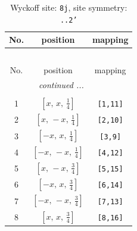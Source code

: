 \documentclass[fleqn,8pt]{jsarticle}
\begin{document}
\begin{longtable}{ccc}
\caption{Wyckoff site: {\tt 8j}, site symmetry: {\tt ..2'}}
 \\
 \hline \hline
No. & position & mapping \\ \hline \endfirsthead

\multicolumn{2}{l}{\tablename\ \thetable{}} \\
 \hline \hline
No. & position & mapping \\ \hline \endhead

 \hline \hline
\multicolumn{2}{r}{\footnotesize\it continued ...} \\ \endfoot

 \hline \hline
\multicolumn{2}{r}{} \\ \endlastfoot

1 & $\left[ x,\, x,\, \frac{1}{4} \right]$ & {\tt [1,11]} \\ \hline
2 & $\left[ x,\, - x,\, \frac{1}{4} \right]$ & {\tt [2,10]} \\ \hline
3 & $\left[ - x,\, x,\, \frac{1}{4} \right]$ & {\tt [3,9]} \\ \hline
4 & $\left[ - x,\, - x,\, \frac{1}{4} \right]$ & {\tt [4,12]} \\ \hline
5 & $\left[ x,\, - x,\, \frac{3}{4} \right]$ & {\tt [5,15]} \\ \hline
6 & $\left[ - x,\, x,\, \frac{3}{4} \right]$ & {\tt [6,14]} \\ \hline
7 & $\left[ - x,\, - x,\, \frac{3}{4} \right]$ & {\tt [7,13]} \\ \hline
8 & $\left[ x,\, x,\, \frac{3}{4} \right]$ & {\tt [8,16]} \\
\end{longtable}
\renewcommand{\arraystretch}{1.2}
\end{document}
